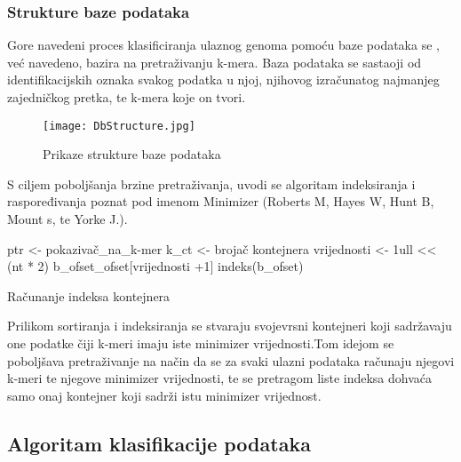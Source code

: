 \documentclass[times, utf8, zavrsni]{fer}
\begin{document}
{\subsubsection{Strukture baze podataka}
Gore navedeni proces klasificiranja ulaznog genoma pomoću baze podataka se , već navedeno, bazira na pretraživanju k-mera. Baza podataka se sastaoji od identifikacijskih oznaka svakog podatka u njoj, njihovog izračunatog najmanjeg zajedničkog pretka, te k-mera koje on tvori.\\
\begin{figure}[hbp]
	\centering
	\texttt{[image: DbStructure.jpg]}
	\caption{Prikaze strukture baze podataka}
	\label{BazaPodataka}
\end{figure}

S ciljem poboljšanja brzine pretraživanja, uvodi se algoritam indeksiranja i raspoređivanja poznat pod imenom Minimizer (Roberts M, Hayes W, Hunt B, Mount s, te Yorke J.).
 

\begin{algorithm}[H]
	ptr <- pokazivač\_na\_k-mer\;
	k\_ct <- brojač kontejnera\;
	vrijednosti <- 1ull << (nt * 2)\;
	b\_ofset\_ofset[vrijednosti +1]\;
	indeks(b\_ofset)\;
	\caption{Računanje indeksa kontejnera}
\end{algorithm}

Prilikom sortiranja i indeksiranja se stvaraju svojevrsni kontejneri koji sadržavaju one podatke čiji k-meri imaju iste minimizer vrijednosti.Tom idejom se poboljšava pretraživanje na način da se za svaki ulazni podataka računaju njegovi k-meri te njegove minimizer vrijednosti, te se pretragom liste indeksa dohvaća samo onaj kontejner koji sadrži istu minimizer vrijednost.


\newpage
\subsection{Algoritam klasifikacije podataka}

}
\end{document}
